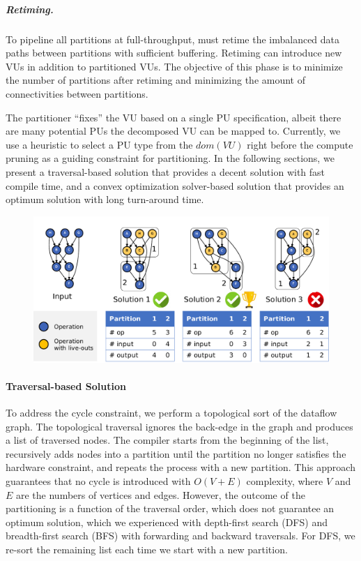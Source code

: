 \subparagraph{Retiming.}
To pipeline all partitions at full-throughput, \name{} must retime the imbalanced data paths between partitions with sufficient buffering. 
Retiming can introduce new VUs in addition to partitioned VUs.
The objective of this phase is to minimize the number of partitions after retiming and minimizing the amount of connectivities between partitions.

The partitioner ``fixes'' the VU based on a single PU specification, albeit there are many potential PUs the decomposed VU can be mapped to.
Currently, we use a heuristic to select a PU type from the $dom(VU)$ right before the compute pruning as a guiding constraint for partitioning.
In the following sections, we present a traversal-based solution that provides a decent solution with fast compile time, and a convex optimization solver-based solution that provides an optimum solution with long turn-around time.

\begin{figure}
  \centering
  \includegraphics[width=1\columnwidth]{figs/parteg.pdf}
  \caption[Compute partitioning example]{
    \todo{}
  }
  \label{fig:parteg}
\end{figure}

\paragraph{Traversal-based Solution}
To address the cycle constraint, we perform a topological sort of the dataflow graph.
The topological traversal ignores the back-edge in the graph and produces a list of traversed nodes. 
The compiler starts from the beginning of the list, recursively adds nodes into a partition until the partition no longer satisfies the hardware constraint, and repeats the process with a new partition.
This approach guarantees that no cycle is introduced with $O(V+E)$ complexity, where $V$ and $E$ are the numbers of vertices and edges.
However, the outcome of the partitioning is a function of the traversal order, which does not guarantee an optimum solution, which we experienced with depth-first search (DFS) and breadth-first search (BFS) with forwarding and backward traversals.
For DFS, we re-sort the remaining list each time we start with a new partition.

